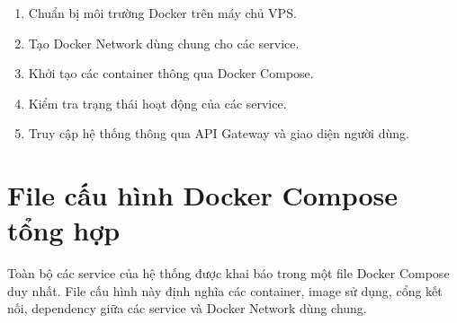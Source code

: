 \documentclass[../DoAn.tex]{subfiles}
\begin{document}
\begin{enumerate}
    \item Chuẩn bị môi trường Docker trên máy chủ VPS.
    \item Tạo Docker Network dùng chung cho các service.
    \item Khởi tạo các container thông qua Docker Compose.
    \item Kiểm tra trạng thái hoạt động của các service.
    \item Truy cập hệ thống thông qua API Gateway và giao diện người dùng.
\end{enumerate}

\section{File cấu hình Docker Compose tổng hợp}

Toàn bộ các service của hệ thống được khai báo trong một file Docker Compose duy nhất. 
File cấu hình này định nghĩa các container, image sử dụng, cổng kết nối, dependency giữa các service và Docker Network dùng chung.
\end{document}
